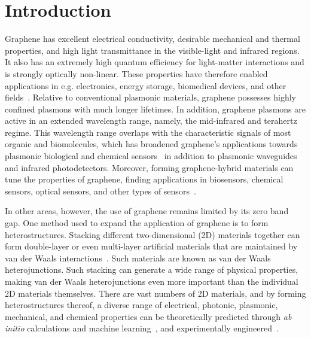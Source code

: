 \clearpage
\section{Introduction}
\label{1_introduction}

Graphene has excellent electrical conductivity,
desirable mechanical and thermal properties,
and high light transmittance in the visible-light and infrared regions.
It also has an extremely high quantum efficiency for light-matter interactions and is strongly optically non-linear.
These properties have therefore enabled applications in e.g. electronics, energy storage, biomedical devices, and other fields~\cite{janavika2023graphene}.
Relative to conventional plasmonic materials, graphene possesses highly confined plasmons with much longer lifetimes.
In addition, graphene plasmons are active in an extended wavelength range, namely, the mid-infrared and terahertz regime.
This wavelength range overlaps with the characteristic signals of most organic and biomolecules,
which has broadened graphene's applications towards plasmonic biological and chemical sensors~\cite{sakthivel2023} in addition to plasmonic waveguides
and infrared photodetectors.
Moreover, forming graphene-hybrid materials can tune the properties of graphene, finding applications in biosensors, chemical sensors, optical sensors, and other types of sensors~\cite{zhang2022}.

In other areas, however, the use of graphene remains limited by its zero band gap.
One method used to expand the application of graphene is to form heterostructures.
Stacking different two-dimensional (2D) materials together can form double-layer or even multi-layer artificial materials that are maintained by van der Waals interactions~\cite{novoselov20162d}.
Such materials are known as van der Waals heterojunctions.
Such stacking can generate a wide range of physical properties,
making van der Waals heterojunctions even more important than the individual 2D materials themselves.
There are vast numbers of 2D materials, and by forming heterostructures thereof,
a diverse range of electrical, photonic, plasmonic, mechanical, and chemical properties can be theoretically predicted through \textit{ab initio} calculations and machine learning~\cite{thygesen2017,he2023}, and experimentally engineered~\cite{lin2023recent,elbanna20232d}.


